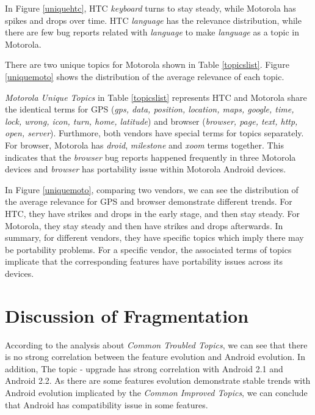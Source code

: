\documentclass[10pt, conference, compsocconf]{IEEEtran}
\begin{document}
In Figure \ref{uniquehtc}, HTC \textit{keyboard} turns to stay steady, while Motorola has spikes and drops over time. HTC \textit{language} has the relevance distribution, while there are few bug reports related with \textit{language} to make \textit{language} as a topic in Motorola.

There are two unique topics for Motorola shown in Table \ref{topicslist}. Figure \ref{uniquemoto} shows the distribution of the average relevance of each topic.

\textit{Motorola Unique Topics} in Table \ref{topicslist} represents HTC and Motorola share the identical terms for GPS (\textit{gps, data, position, location, maps, google, time, lock, wrong, icon, turn, home, latitude}) and browser (\textit{browser, page, text, http, open, server}). Furthmore, both vendors have special terms for topics separately. For browser, Motorola has \textit{droid}, \textit{milestone} and \textit{xoom} terms together. This indicates that the \textit{browser} bug reports happened frequently in three Motorola devices and \textit{browser} has portability issue within Motorola Android devices.

In Figure \ref{uniquemoto}, comparing two vendors, we can see the distribution of the average relevance for GPS and browser demonstrate different trends. For HTC, they have strikes and drops in the early stage, and then stay steady. For Motorola, they stay steady and then have strikes and drops afterwards.
In summary, for different vendors, they have specific topics which imply there may be portability problems. For a specific vendor, the associated terms of topics implicate that the corresponding features have portability issues across its devices.

\section{Discussion of Fragmentation}
\label{sec:fragmentation}

According to the analysis about \textit{Common Troubled Topics}, we can see that there is no strong correlation between the feature evolution and Android evolution. In addition, The topic - upgrade has strong correlation with Android 2.1 and Android 2.2. As there are some features evolution demonstrate stable trends with Android evolution implicated by the \textit{Common Improved Topics}, we can conclude that Android has compatibility issue in some features.
\end{document}

